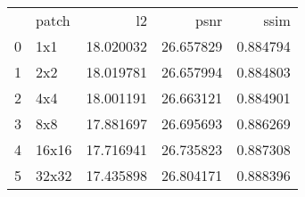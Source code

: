 \begin{tabular}{llrrr}
 & patch & l2 & psnr & ssim \\
0 & 1x1 & 18.020032 & 26.657829 & 0.884794 \\
1 & 2x2 & 18.019781 & 26.657994 & 0.884803 \\
2 & 4x4 & 18.001191 & 26.663121 & 0.884901 \\
3 & 8x8 & 17.881697 & 26.695693 & 0.886269 \\
4 & 16x16 & 17.716941 & 26.735823 & 0.887308 \\
5 & 32x32 & 17.435898 & 26.804171 & 0.888396 \\
\end{tabular}


